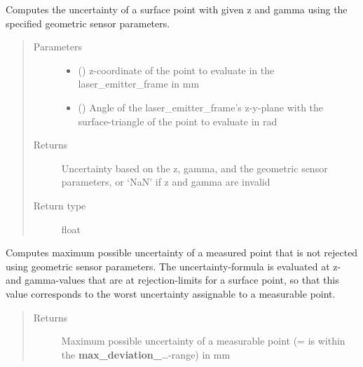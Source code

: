 \documentclass[letterpaper,10pt,english]{sphinxmanual}
\begin{document}
\begin{fulllineitems}

\begin{fulllineitems}
\label{\detokenize{module_sensor_model:agiprobot_measurement.sensor_model.SensorModel.evaluate_uncertainty}}
Computes the uncertainty of a surface point with given z and gamma using the specified geometric sensor parameters.
\begin{quote}\begin{description}
\item[{Parameters}] \leavevmode\begin{itemize}
\item {} 
 () \textendash{} z-coordinate of the point to evaluate in the laser\_emitter\_frame in mm

\item {} 
 () \textendash{} Angle of the laser\_emitter\_frame’s z-y-plane with the surface-triangle of the point to evaluate in rad

\end{itemize}

\item[{Returns}] \leavevmode
Uncertainty based on the z, gamma, and the geometric sensor parameters, or ‘NaN’ if z and gamma are invalid

\item[{Return type}] \leavevmode
float

\end{description}\end{quote}

\end{fulllineitems}


\begin{fulllineitems}
\label{\detokenize{module_sensor_model:agiprobot_measurement.sensor_model.SensorModel.get_max_uncertainty}}
Computes maximum possible uncertainty of a measured point that is not rejected using geometric sensor parameters. 
The uncertainty-formula is evaluated at z- and gamma-values that are at rejection-limits for a surface point, so that this value corresponds
to the worst uncertainty assignable to a measurable point.
\begin{quote}\begin{description}
\item[{Returns}] \leavevmode
Maximum possible uncertainty of a measurable point (= is within the {\color{red}\bfseries{}max\_deviation\_}…-range) in mm


\end{description}
\end{quote}
\end{fulllineitems}
\end{fulllineitems}
\end{document}
